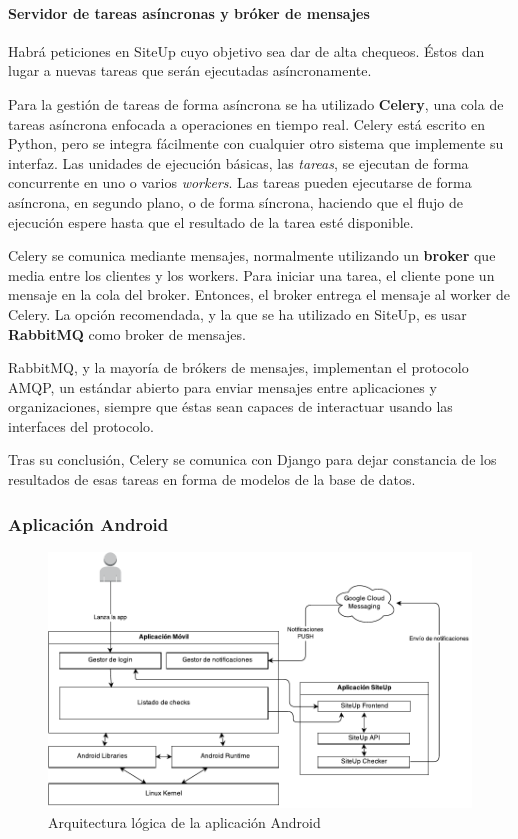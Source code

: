 \paragraph{Servidor de tareas asíncronas y bróker de mensajes}

Habrá peticiones en SiteUp cuyo objetivo sea dar de alta chequeos. Éstos dan
lugar a nuevas tareas que serán ejecutadas asíncronamente. 

Para la gestión de tareas de forma asíncrona se ha utilizado \textbf{Celery},
una cola de tareas asíncrona enfocada a operaciones en tiempo real. Celery está
escrito en Python, pero se integra fácilmente con cualquier otro sistema que
implemente su interfaz. Las unidades de ejecución básicas, las \textit{tareas},
se ejecutan de forma concurrente en uno o varios \textit{workers}. Las tareas
pueden ejecutarse de forma asíncrona, en segundo plano, o de forma síncrona,
haciendo que el flujo de ejecución espere hasta que el resultado de la tarea
esté disponible.

Celery se comunica mediante mensajes, normalmente utilizando un \textbf{broker}
que media entre los clientes y los workers. Para iniciar una tarea, el cliente
pone un mensaje en la cola del broker. Entonces, el broker entrega el mensaje al
worker de Celery. La opción recomendada, y la que se ha utilizado en SiteUp, es
usar \textbf{RabbitMQ} como broker de mensajes.

RabbitMQ, y la mayoría de brókers de mensajes, implementan el protocolo
\ac{AMQP}, un estándar abierto para enviar mensajes entre aplicaciones y
organizaciones, siempre que éstas sean capaces de interactuar usando las
interfaces del protocolo.

Tras su conclusión, Celery se comunica con Django para dejar constancia de los
resultados de esas tareas en forma de modelos de la base de datos.


\subsubsection{Aplicación Android}
\label{subsec:arquitectura-logica-android}


\begin{figure}[hbtp]
  \centering
  \includegraphics[width=\textwidth]{5_diseno/diagrama_arquitectura_logica_android}
  \caption{Arquitectura lógica de la aplicación Android}
  \label{fig:arquitectura-logica-android}
\end{figure}

